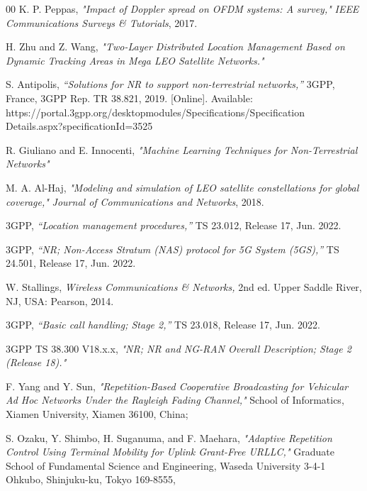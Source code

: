 \documentclass[conference]{IEEEtran}
\begin{document}
\begin{thebibliography}{00}
 K. P. Peppas, \textit{"Impact of Doppler spread on OFDM systems: A survey,"} \textit{IEEE Communications Surveys \& Tutorials}, 2017.

 H. Zhu and Z. Wang, \textit{"Two-Layer Distributed Location Management Based on Dynamic Tracking Areas in Mega LEO Satellite Networks."} %

 S. Antipolis, \textit {“Solutions for NR to support non-terrestrial networks,”} 3GPP, France, 3GPP Rep. TR 38.821, 2019. [Online]. Available: https://portal.3gpp.org/desktopmodules/Specifications/Specification Details.aspx?specificationId=3525


  R. Giuliano and E. Innocenti, \textit{ "Machine Learning Techniques for Non-Terrestrial Networks"} %

 M. A. Al-Haj, \textit{"Modeling and simulation of LEO satellite constellations for global coverage,"}  \textit{Journal of Communications and Networks}, 2018.

 3GPP, \textit{“Location management procedures,”} TS 23.012, Release 17, Jun. 2022.

 3GPP, \textit{“NR; Non-Access Stratum (NAS) protocol for 5G System (5GS),”} TS 24.501, Release 17, Jun. 2022.

 W. Stallings, \textit{Wireless Communications \& Networks,} 2nd ed. Upper Saddle River, NJ, USA: Pearson, 2014.

 3GPP, \textit{“Basic call handling; Stage 2,”} TS 23.018, Release 17, Jun. 2022.

 3GPP TS 38.300 V18.x.x, \textit{"NR; NR and NG-RAN Overall Description; Stage 2 (Release 18)."}

 F. Yang and Y. Sun, \textit{"Repetition-Based Cooperative Broadcasting for Vehicular Ad Hoc Networks Under the Rayleigh Fading Channel,"}  School of Informatics, Xiamen University, Xiamen 36100, China; %

 S. Ozaku, Y. Shimbo, H. Suganuma, and F. Maehara, \textit{"Adaptive Repetition Control Using Terminal Mobility for Uplink Grant-Free URLLC,"}  Graduate School of Fundamental Science and Engineering, Waseda University 3-4-1 Ohkubo, Shinjuku-ku, Tokyo 169-8555, %


\end{thebibliography}
\end{document}
